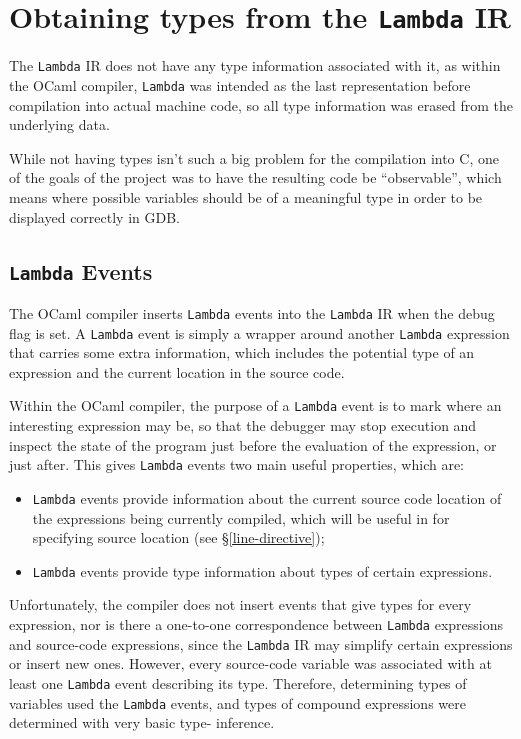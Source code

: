 \section{Obtaining types from the \texttt{Lambda} IR}\label{lambda-types}

The \texttt{Lambda} IR does not have any type information associated with it, as
within the OCaml compiler, \texttt{Lambda} was intended as the last
representation before compilation into actual machine code, so all type
information was erased from the underlying data.

While not having types isn't such a big problem for the compilation into C, one
of the goals of the project was to have the resulting code be ``observable'',
which means where possible variables should be of a meaningful type in order to
be displayed correctly in GDB.

\subsection{\texttt{Lambda} Events}\label{levents}

The OCaml compiler inserts \texttt{Lambda} events into the \texttt{Lambda} IR
when the debug flag is set. A \texttt{Lambda} event is simply a wrapper around
another \texttt{Lambda} expression that carries some extra information, which
includes the potential type of an expression and the current location in the
source code.

Within the OCaml compiler, the purpose of a \texttt{Lambda} event is to mark
where an interesting expression may be, so that the debugger may stop execution
and inspect the state of the program just before the evaluation of the
expression, or just after. This gives \texttt{Lambda} events two main useful
properties, which are:

\begin{itemize}

\item \texttt{Lambda} events provide information about the current source code
    location of the expressions being currently compiled, which will be useful
    in for specifying source location (see \S\ref{line-directive});

\item \texttt{Lambda} events provide type information about types of certain
    expressions.

\end{itemize}

Unfortunately, the compiler does not insert events that give types for every
expression, nor is there a one-to-one correspondence between \texttt{Lambda}
expressions and source-code expressions, since the \texttt{Lambda} IR may
simplify certain expressions or insert new ones. However, every source-code
variable was associated with at least one \texttt{Lambda} event describing its
type. Therefore, determining types of variables used the \texttt{Lambda} events,
and types of compound expressions were determined with very basic type-
inference.

